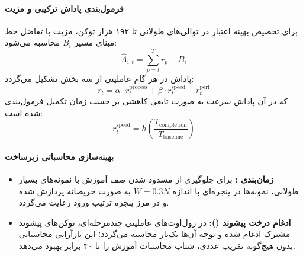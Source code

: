 \paragraph*{فرمول‌بندی پاداش ترکیبی و مزیت }
برای تخصیص بهینه اعتبار در توالی‌های طولانی تا ۱۹۲ هزار توکن، مزیت با تفاضل خط مبنای مسیر $B_i$ محاسبه می‌شود:
\begin{equation}
    \hat{A}_{i,t} = \sum_{p=t}^T r_p - B_i
\end{equation}
پاداش در هر گام عاملیتی از سه بخش تشکیل می‌گردد:
\begin{equation}
    r_t = \alpha \cdot r_t^{\text{process}} + \beta \cdot r_t^{\text{speed}} + r_t^{\text{perf}}
\end{equation}
که در آن پاداش سرعت به صورت تابعی کاهشی بر حسب زمان تکمیل فرمول‌بندی شده است:
\begin{equation}
    r_t^{\text{speed}} = h\left(\frac{T_{\text{completion}}}{T_{\text{baseline}}}\right)
\end{equation}

\paragraph*{بهینه‌سازی محاسباتی زیرساخت }
\begin{itemize}
    \item \textbf{زمان‌بندی :} برای جلوگیری از مسدود شدن صف آموزش با نمونه‌های بسیار طولانی، نمونه‌ها در پنجره‌ای با اندازه $W = 0.3N$ به صورت حریصانه پردازش شده و در مرز پنجره ترتیب ورود رعایت می‌گردد.
    \item \textbf{ادغام درخت پیشوند ():} در رول‌اوت‌های عاملیتی چندمرحله‌ای، توکن‌های پیشوند مشترک ادغام شده و توجه آن‌ها یک‌بار محاسبه می‌گردد؛ این بازآرایی محاسباتی بدون هیچ‌گونه تقریب عددی، شتاب محاسبات آموزش را تا ۴۰ برابر بهبود می‌دهد.
\end{itemize}

